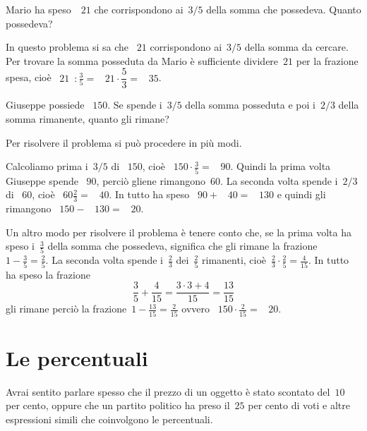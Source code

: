 \begin{exrig}
 \begin{esempio}
Mario ha speso~\officialeuro~$21$ che corrispondono ai~$3/5$ della somma che possedeva. Quanto possedeva?

In questo problema si sa che \officialeuro~$21$ corrispondono ai~$3/5$ della somma da cercare.
Per trovare la somma posseduta da Mario è sufficiente dividere~$21$ per la frazione spesa, cioè
\officialeuro~$21$~$\displaystyle:\frac{3}{5}=$ \officialeuro~$21\cdot\dfrac{5}{3}=$ \officialeuro~$35$.
 \end{esempio}

 \begin{esempio}
Giuseppe possiede \officialeuro~$150$. Se spende i~$3/5$ della somma posseduta e poi i~$2/3$ della somma rimanente,
quanto gli rimane?

Per risolvere il problema si può procedere in più modi.

Calcoliamo prima i~$3/5$ di \officialeuro~$150$, cioè \officialeuro~$150\cdot\frac{3}{5}=$ \officialeuro~$90$.
Quindi la prima volta Giuseppe spende \officialeuro~$90$, perciò gliene rimangono~$60$. La seconda volta spende
i~$2/3$ di \officialeuro~$60$, cioè \officialeuro~$60\frac{2}{3}=$ \officialeuro~$40$. In tutto ha speso
\officialeuro~$90+$ \officialeuro~$40=$ \officialeuro~$130$ e quindi gli rimangono \officialeuro~$150-$ \officialeuro~$130=$ \officialeuro~$20$.

Un altro modo per risolvere il problema è tenere conto che,
se la prima volta ha speso i~$\frac{3}{5}$ della somma che possedeva,
significa che gli rimane la frazione~$1-\frac{3}{5}=\frac{2}{5}$.
La seconda volta spende i~$\frac{2}{3}$ dei~$\frac{2}{5}$ rimanenti, cioè~$\frac{2}{3}\cdot\frac{2}{5}=\frac{4}{15}$.
In tutto ha speso la frazione
\[\frac{3}{5}+\frac{4}{15}=\frac{3\cdot3+4}{15}=\frac{13}{15}\]
gli rimane perciò la frazione~$1-\frac{13}{15}=\frac{2}{15}$ ovvero \officialeuro~$150\cdot\frac{2}{15}=$ \officialeuro~$20$.
 \end{esempio}
\end{exrig}

\ovalbox{\risolvii \ref{ese:3.78}, \ref{ese:3.79}, \ref{ese:3.80}, \ref{ese:3.81}}

\section{Le percentuali}

Avrai sentito parlare spesso che il prezzo di un oggetto è stato scontato del~$10$ per cento,
oppure che un partito politico ha preso il~$25$ per cento di voti
e altre espressioni simili che coinvolgono le percentuali.

